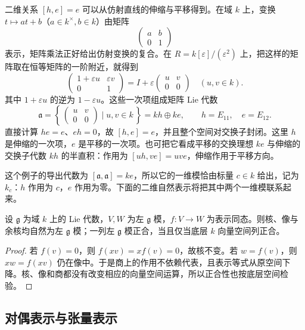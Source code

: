 \ProseParagraphBreak

二维关系 \([h,e]=e\) 可以从仿射直线的伸缩与平移得到。在域 \(k\) 上，变换 \(t\mapsto at+b\)（\(a\in k^\times,b\in k\)）由矩阵
\[
	\begin{pmatrix}a&b\\0&1\end{pmatrix}
\]
表示，矩阵乘法正好给出仿射变换的复合。在 \(R=k[\varepsilon]/(\varepsilon^2)\) 上，把这样的矩阵取在恒等矩阵的一阶附近，就得到
\[
	\begin{pmatrix}1+\varepsilon u&\varepsilon v\\0&1\end{pmatrix}
	=I+\varepsilon\begin{pmatrix}u&v\\0&0\end{pmatrix}
	\quad(u,v\in k).
\]
其中 \(1+\varepsilon u\) 的逆为 \(1-\varepsilon u\)。这些一次项组成矩阵 Lie 代数
\[
	\mathfrak a=
	\left\{\,\begin{pmatrix}u&v\\0&0\end{pmatrix}\mid u,v\in k\,\right\}
	=kh\oplus ke,\qquad h=E_{11},\quad e=E_{12}.
\]
直接计算 \(he=e\)、\(eh=0\)，故 \([h,e]=e\)，并且整个空间对交换子封闭。这里 \(h\) 是伸缩的一次项，\(e\) 是平移的一次项。也可把它看成平移的交换理想 \(ke\) 与伸缩的交换子代数 \(kh\) 的半直积：作用为 \([uh,ve]=uv e\)，伸缩作用于平移方向。

\ProseParagraphBreak

这个例子的导出代数为 \([\mathfrak a,\mathfrak a]=ke\)，所以它的一维模恰由标量 \(c\in k\) 给出，记为 \(k_c\)：\(h\) 作用为 \(c\)，\(e\) 作用为零。下面的二维自然表示将把其中两个一维模联系起来。

\begin{proposition}\label{b5:prop:lie-invariant-subquotients}
	设 \(\mathfrak g\) 为域 \(k\) 上的 Lie 代数，\(V,W\) 为左 \(\mathfrak g\) 模，\(f:V\to W\) 为表示同态。则核、像与余核均自然为左 \(\mathfrak g\) 模；一列左 \(\mathfrak g\) 模正合，当且仅当底层 \(k\) 向量空间列正合。
\end{proposition}
\begin{proof}
	若 \(f(v)=0\)，则 \(f(xv)=xf(v)=0\)，故核不变。若 \(w=f(v)\)，则 \(xw=f(xv)\) 仍在像中。于是商上的作用不依赖代表，且表示等式从原空间下降。核、像和商都没有改变相应的向量空间运算，所以正合性也按底层空间检验。
\end{proof}

\subsection{对偶表示与张量表示}
\label{b5:subsec:1103:02}


